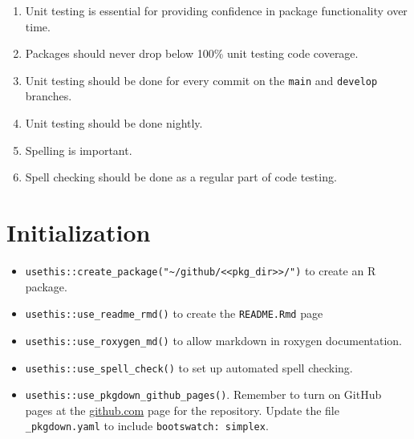 \documentclass{article}
\begin{document}
\begin{enumerate}

  \item Unit testing is essential for providing confidence in package functionality over time.

  \item Packages should never drop below 100\% unit testing code coverage.

  \item Unit testing should be done for every commit on the \texttt{main} and \texttt{develop}
        branches.

  \item Unit testing should be done nightly.

  \item Spelling is important.

  \item Spell checking should be done as a regular part of code testing.

\end{enumerate}


\section{Initialization}
\label{sec:initialiation}

\begin{itemize}

  \item \verb|usethis::create_package("~/github/<<pkg_dir>>/")| to create an R package.

  \item \verb|usethis::use_readme_rmd()| to create the \verb|README.Rmd| page

  \item \verb|usethis::use_roxygen_md()| to allow markdown in roxygen documentation.

  \item \verb|usethis::use_spell_check()| to set up automated spell checking.

  \item \verb|usethis::use_pkgdown_github_pages()|.
  		Remember to turn on GitHub pages at the \url{github.com} page for the repository.
		Update the file \verb|_pkgdown.yaml| to include \verb|bootswatch: simplex|.

\end{itemize}
\end{document}
